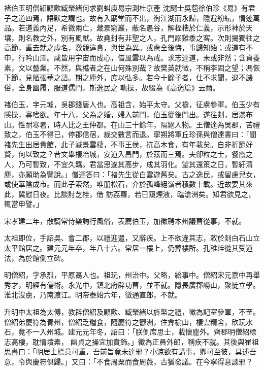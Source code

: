 
\begin{pinyinscope}

 褚伯玉明僧紹顧歡臧榮緒何求劉虯庾易宗測杜京產
 沈飀士吳苞徐伯珍《易》有君子之道四焉，語默之謂也。故有入廟堂而不出，徇江湖而永歸，隱避紛紜，情迹萬品。若道義內足，希微兩亡，藏景窮巖，蔽名愚谷，解桎梏於仁義，示形神於天壤，則名教之外，別有風猷。故堯封有非聖之人，孔門謬雞黍之客。次則揭獨往之高節，重去就之虛名，激競違貪，與世為異。或慮全後悔，事歸知殆；或道有不申，行吟山澤。咸皆用宇宙而成心，借風雲以為戒。求志達道，未或非然；含貞養素，文以藝業。不然，與樵者之在山何殊別哉？故樊英就徵，不稱李固之望；馮恢下節，見陋張華之語。期之塵外，庶以弘多。若今十餘子者，仕不求聞，退不譏俗，全身幽履，服道儒門，斯逸民之
 軌操，故綴為《高逸篇》云爾。



 褚伯玉，字元璩，吳郡錢唐人也。高祖含，始平太守。父襜，征虜參軍。伯玉少有隱操，寡嗜欲。年十八，父為之婚，婦入前門，伯玉從後門出。遂往剡，居瀑布山。性耐寒暑，時人比之王仲都。在山三十餘年，隔絕人物。王僧達為吳郡，苦禮致之，伯玉不得已，停郡信宿，裁交數言而退。寧朔將軍丘珍孫與僧達書曰：「聞褚先生出居貴館，此子滅景雲棲，不事王侯，抗高木食，有年載矣。自非折節好賢，何以致之？昔文舉棲冶城，安道入昌門，於茲而三焉。夫卻粒之士，餐霞之人，乃可暫致，不宜久羈。君當思遂其高步，成其羽化。望其還策之日，暫紆清塵，亦願助為譬說。」僧達答曰：「褚先生從白雲遊舊矣。古之逸民，或留慮兒女，或使華陰成市。而此子索然，唯朋松石，介於孤峰絕嶺者積數十載。近故要其來此，冀慰日夜。比談討芝桂，借
 訪荔蘿，若已窺煙液，臨滄洲矣。知君欲見之，輒當申譬。」



 宋孝建二年，散騎常侍樂詢行風俗，表薦伯玉，加徵聘本州議曹從事，不就。



 太祖即位，手詔吳、會二郡，以禮迎遣，又辭疾。上不欲違其志，敕於剡白石山立太平館居之。建元元年卒，年八十六。常居一樓上，仍葬樓所。孔稚珪從其受道法，為於館側立碑。



 明僧紹，字承烈，平原鬲人也。祖玩，州治中。父略，給事中。僧紹宋元嘉中再舉秀才，明經有儒術。永光中，鎮北府辟功曹，並不就。隱長廣郡嶗山，聚徒立學。淮北沒虜，乃南渡江。明帝泰始六年，徵通直郎，不就。



 升明中太祖為太傅，教辟僧紹及顧歡、臧榮緒以旍幣之禮，徵為記室參軍，不至。僧紹弟慶符為青州，僧紹乏糧食，隨慶符之鬱洲，住弇榆山，棲雲精舍，欣玩水石，竟不一入州城。建元元年冬，詔曰：「朕側席思士，載懷塵外。齊郡明僧紹標志高棲，耽情墳素，
 幽貞之操宜加賁飾。」徵為正員外郎，稱疾不就。其後與崔祖思書曰：「明居士標意可重，吾前旨竟未達邪？小涼欲有講事，卿可至彼，具述吾意，令與慶符俱歸。」又曰：「不食周粟而食周薇，古猶發議。在今寧得息談邪？




\end{pinyinscope}

